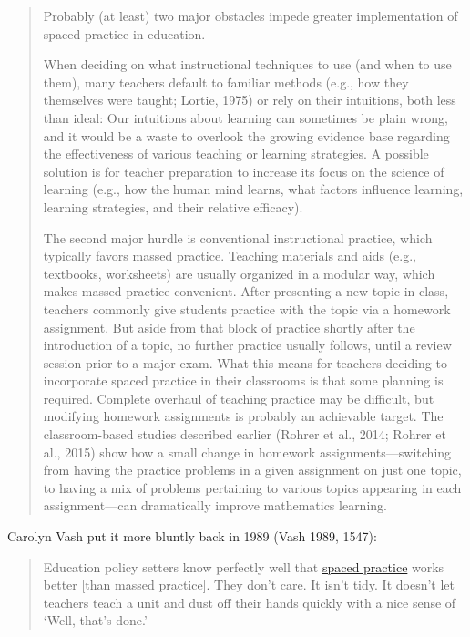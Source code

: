 \begin{quote}
Probably (at least) two major obstacles impede greater implementation of
spaced practice in education.

When deciding on what instructional techniques to use (and when to use
them), many teachers default to familiar methods (e.g., how they
themselves were taught; Lortie, 1975) or rely on their intuitions, both
less than ideal: Our intuitions about learning can sometimes be plain
wrong, and it would be a waste to overlook the growing evidence base
regarding the effectiveness of various teaching or learning strategies.
A possible solution is for teacher preparation to increase its focus on
the science of learning (e.g., how the human mind learns, what factors
influence learning, learning strategies, and their relative efficacy).

The second major hurdle is conventional instructional practice, which
typically favors massed practice. Teaching materials and aids (e.g.,
textbooks, worksheets) are usually organized in a modular way, which
makes massed practice convenient. After presenting a new topic in class,
teachers commonly give students practice with the topic via a homework
assignment. But aside from that block of practice shortly after the
introduction of a topic, no further practice usually follows, until a
review session prior to a major exam. What this means for teachers
deciding to incorporate spaced practice in their classrooms is that some
planning is required. Complete overhaul of teaching practice may be
difficult, but modifying homework assignments is probably an achievable
target. The classroom-based studies described earlier (Rohrer et al.,
2014; Rohrer et al., 2015) show how a small change in homework
assignments---switching from having the practice problems in a given
assignment on just one topic, to having a mix of problems pertaining to
various topics appearing in each assignment---can dramatically improve
mathematics learning.
\end{quote}

Carolyn Vash put it more bluntly back in 1989 (Vash 1989, 1547):

\begin{quote}
Education policy setters know perfectly well that
\protect\hyperlink{spaced-practice}{spaced practice} works better
{[}than massed practice{]}. They don't care. It isn't tidy. It doesn't
let teachers teach a unit and dust off their hands quickly with a nice
sense of `Well, that's done.'
\end{quote}

